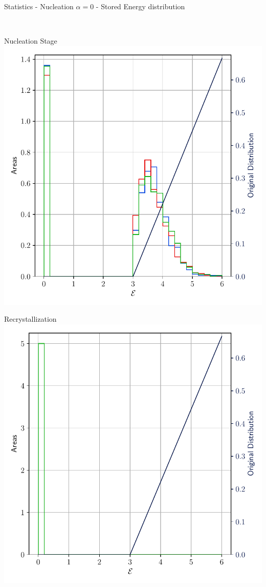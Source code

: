 \documentclass[usenames,dvipsnames]{beamer}
\begin{document}
\begin{frame}{Statistics - Nucleation $\alpha = 0$  - Stored Energy distribution}
\begin{minipage}{0.5\textwidth}
    \end{minipage}\\
    \begin{minipage}{0.5\textwidth}
    \centering
    \scriptsize
    Nucleation Stage
    \includegraphics[trim={0 1em 0 1.1em},clip=true,scale=0.35]{figures/stored_energy/SE/se/000110_nuclconstant_set.pdf}
    \end{minipage}%
    \begin{minipage}{0.5\textwidth}
    \centering
    \scriptsize
    Recrystallization
    \includegraphics[trim={0 1em 0 1.1em},clip=true,scale=0.35]{figures/stored_energy/SE/se/000240_nuclconstant_set.pdf}
    \end{minipage}
\end{frame}
\end{document}
